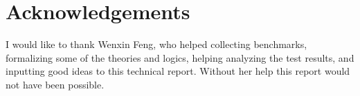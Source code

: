 \documentclass[10pt,letter]{article}
\theoremstyle{definition}
\begin{document}
\section{Acknowledgements}

I would like to thank Wenxin Feng, who helped collecting benchmarks, formalizing some of the theories and logics, helping analyzing the test results, and inputting good ideas to this technical report. Without her help this report would not have been possible.












\end{document}
